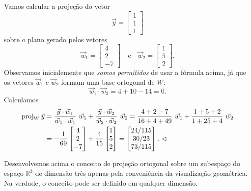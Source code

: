 \begin{ex}
Vamos calcular a projeção do vetor
\begin{equation}
\vec{y} =
\begin{bmatrix}
 1\\1\\1
\end{bmatrix}
\end{equation} sobre o plano gerado pelos vetores
\begin{equation}
\vec{w}_1 =
\begin{bmatrix}
 4\\2\\-7
\end{bmatrix} \quad \text{e} \quad
\vec{w}_2 =
\begin{bmatrix}
 1\\5\\2
\end{bmatrix}.
\end{equation} Observamos inicialemente que \textit{somos permitidos} de usar a fórmula acima, já que os vetores $\vec{w}_1$ e $\vec{w}_2$ formam uma base ortogonal de $W$:
\begin{equation}
\vec{w}_1 \cdot \vec{w}_2 = 4 + 10 -14 = 0.
\end{equation} Calculamos
  \begin{align*}
\operatorname{proj}_W \vec{y} & = \frac{\vec{y} \cdot \vec{w}_1}{\vec{w}_1 \cdot \vec{w}_1} \ \vec{w}_1 + \frac{\vec{y} \cdot \vec{w}_2}{\vec{w}_2 \cdot \vec{w}_2} \ \vec{w}_2 = \frac{4 + 2 -7}{16 + 4 + 49} \ \vec{w}_1 + \frac{1 + 5 + 2}{1+25+4} \ \vec{w}_2 \\
                & = -\frac{1}{69}
                \begin{bmatrix}
 4\\2\\-7
\end{bmatrix}
                + \frac{4}{15}
\begin{bmatrix}
 1\\5\\2
\end{bmatrix} =
\begin{bmatrix}
 24/115 \\ 30/23 \\ 73/115
\end{bmatrix}. \ \lhd
  \end{align*}
\end{ex}


Desenvolvemos acima o conceito de projeção ortogonal sobre um subespaço do espaço $\mathbb{R}^3$ de dimensão três apenas pela conveniência da visualização geométrica. Na verdade, o conceito pode ser definido em qualquer dimensão.

